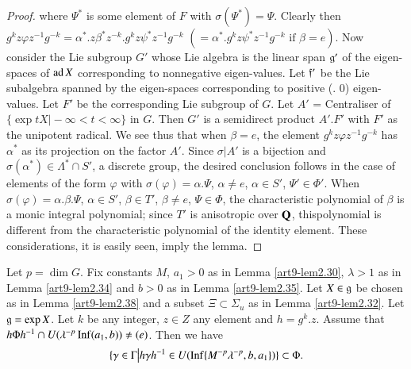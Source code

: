 \begin{proof}
where $\Psi^\ast$ is some element of $F$ with $\sigma (\Psi^\ast) =\Psi$. Clearly then $g^k z \varphi z^{-1} g^{-k} = \alpha^{\ast}. z \beta^{\ast} z^{-k}. g^k z \psi^\ast z^{-1}g^{-k}$ $(= \alpha^{\ast} . g^k z \psi^\ast z^{-1} g^{-k} \text{ if } \beta = e)$. Now consider the Lie subgroup $G'$ whose Lie algebra is the linear span $\mathfrak{g}'$ of the eigen-spaces of $\operatorname{ad} X$ corresponding to nonnegative eigen-values. Let $\mathfrak{f}'$ be the Lie subalgebra spanned by the eigen-spaces corresponding to positive (\resp. 0) eigen-values. Let $F'$ be the corresponding Lie subgroup of $G$. Let $A'$ = Centraliser of $\{\exp t X \big| - \infty < t < \infty\}$ in $G$. Then $G'$ is a semidirect product $A'.F'$ with $F'$ as the unipotent radical. We see thus that when $\beta =e$, the element $g^k z \varphi z^{-1} g^{-k}$ has $\alpha^\ast$ as its projection on the factor $A'$. Since $\sigma|A'$ is a bijection and $\sigma (\alpha^\ast) \in \Lambda^\ast \cap S'$, a discrete group, the desired conclusion follows in the case of elements of the form $\varphi$ with $\sigma (\varphi) = \alpha . \Psi$, $\alpha \neq e$, $\alpha \in S'$, $\Psi' \in \Phi'$. When $\sigma (\varphi)= \alpha. \beta. \Psi$, $\alpha \in S'$, $\beta \in T'$, $\beta \neq e$, $\Psi \in \Phi$, the characteristic polynomial of $\beta$ is a monic integral polynomial; since $T'$ is anisotropic over $\mathbf{Q}$, this\pageoriginale polynomial is different from the characteristic polynomial of the identity element. These considerations, it is easily seen, imply the lemma.
\end{proof}

\begin{lemma}\label{art9-lem2.36}
Let  $p = \dim G$. Fix constants $M$, $a_1 >0$ as in Lemma \ref{art9-lem2.30}, $\lambda >1$ as in Lemma \ref{art9-lem2.34} and $b>0$ as in Lemma \ref{art9-lem2.35}. Let $X \in \mathfrak{g}$ be chosen as in Lemma \ref{art9-lem2.38} and a subset $\Xi\subset \Sigma_u$ as in Lemma \ref{art9-lem2.32}. Let $\mathfrak{g} = \exp X$. Let $k$ be any integer, $z \in Z$ any element and $h = g^k.z$. Assume that $h \Phi h^{-1} \cap U (\lambda^{-p} \operatorname{Inf} (a_1, b)) \neq (e)$. Then we have
$$
\{\gamma \in \Gamma \big| h \gamma h^{-1} \in U (\operatorname{Inf} \{M^{-p} \lambda^{-p} , b, a_1\})\} \subset \Phi.
$$
\end{lemma}

